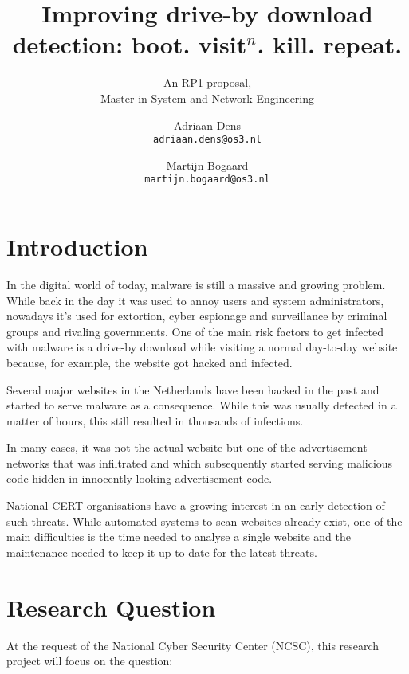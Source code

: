 \documentclass{scrartcl}
\title{Improving drive-by download detection: boot. visit$^n$. kill. repeat.}
\subtitle{An RP1 proposal,\\Master in System and Network Engineering}
\author{
  Adriaan Dens\\
   \texttt{adriaan.dens@os3.nl}
  \and
  Martijn Bogaard\\
   \texttt{martijn.bogaard@os3.nl}
}
\begin{document}
\maketitle

\section{Introduction}

In the digital world of today, malware is still a massive and growing problem. While back in the day it was used to annoy users and system administrators, nowadays it's used for extortion, cyber espionage and surveillance by criminal groups and rivaling governments. One of the main risk factors to get infected with malware is a drive-by download while visiting a normal day-to-day website because, for example, the website got hacked and infected. 

Several major websites in the Netherlands have been hacked in the past and started to serve malware as a consequence. While this was usually detected in a matter of hours, this still resulted in thousands of infections.

In many cases, it was not the actual website but one of the advertisement networks that was infiltrated and which subsequently started serving malicious code hidden in innocently looking advertisement code.


National CERT organisations have a growing interest in an early detection of such threats. While automated systems to scan websites already exist, one of the main difficulties is the time needed to analyse a single website and the maintenance needed to keep it up-to-date for the latest threats.

\section{Research Question}
At the request of the National Cyber Security Center (NCSC), this research project will focus on the question:\\ %
\end{document}
